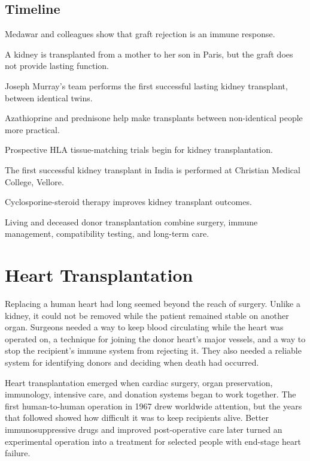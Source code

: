 \documentclass[12pt,oneside]{book}
\begin{document}
\section*{Timeline}
\begin{description}[leftmargin=2.3cm,style=nextline]
  \item[1940s] Medawar and colleagues show that graft rejection is an immune response.
  \item[1952] A kidney is transplanted from a mother to her son in Paris, but the graft does not provide lasting function.
  \item[1954] Joseph Murray's team performs the first successful lasting kidney transplant, between identical twins.
  \item[1962--1963] Azathioprine and prednisone help make transplants between non-identical people more practical.
  \item[1964] Prospective HLA tissue-matching trials begin for kidney transplantation.
  \item[1971] The first successful kidney transplant in India is performed at Christian Medical College, Vellore.
  \item[1980] Cyclosporine-steroid therapy improves kidney transplant outcomes.
  \item[Today] Living and deceased donor transplantation combine surgery, immune management, compatibility testing, and long-term care.
\end{description}
\chapter[Heart Transplantation]{Heart Transplantation}

Replacing a human heart had long seemed beyond the reach of surgery. Unlike a
kidney, it could not be removed while the patient remained stable on another
organ. Surgeons needed a way to keep blood circulating while the heart was
operated on, a technique for joining the donor heart's major vessels, and a
way to stop the recipient's immune system from rejecting it. They also needed
a reliable system for identifying donors and deciding when death had
occurred.

Heart transplantation emerged when cardiac surgery, organ preservation,
immunology, intensive care, and donation systems began to work together. The
first human-to-human operation in 1967 drew worldwide attention, but the years that
followed showed how difficult it was to keep recipients alive. Better
immunosuppressive drugs and improved post-operative care later turned an
experimental operation into a treatment for selected people with end-stage
heart failure.
\end{document}
